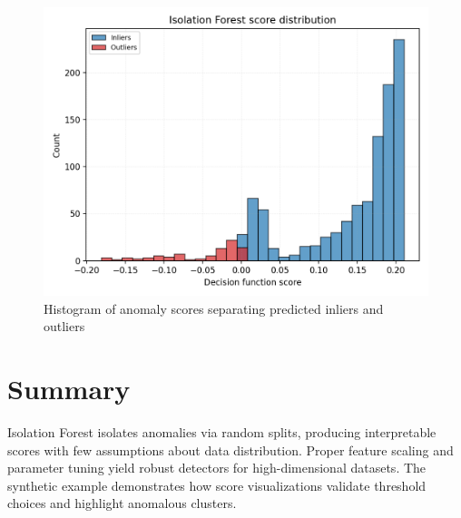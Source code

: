 ﻿\documentclass[12pt]{article}
\begin{document}
\begin{figure}[H]
  \centering
  \includegraphics[width=0.78\linewidth]{isolation_forest_score_hist.png}
  \caption{Histogram of anomaly scores separating predicted inliers and outliers}
  \label{fig:isolation_forest_score_hist}
\end{figure}

\FloatBarrier
\section{Summary}
Isolation Forest isolates anomalies via random splits, producing interpretable scores with few assumptions about data distribution. Proper feature scaling and parameter tuning yield robust detectors for high-dimensional datasets. The synthetic example demonstrates how score visualizations validate threshold choices and highlight anomalous clusters.
\end{document}

